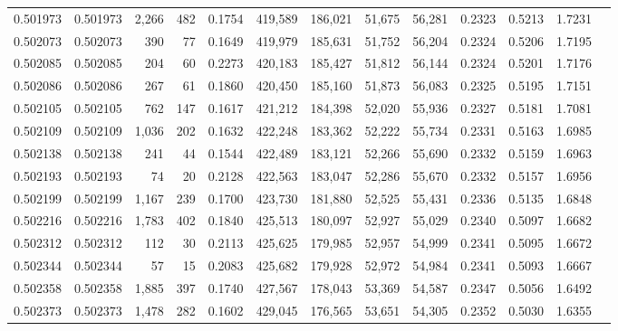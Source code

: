 \begin{tabular}{rrrrrrrrrrrrr}
0.501973 & 0.501973 & 2,266 &   482 &                                     0.1754 & 419,589 & 186,021 &  51,675 &  56,281 & 0.2323 & 0.5213 & 1.7231 \\
0.502073 & 0.502073 &   390 &    77 &                                     0.1649 & 419,979 & 185,631 &  51,752 &  56,204 & 0.2324 & 0.5206 & 1.7195 \\
0.502085 & 0.502085 &   204 &    60 &                                     0.2273 & 420,183 & 185,427 &  51,812 &  56,144 & 0.2324 & 0.5201 & 1.7176 \\
0.502086 & 0.502086 &   267 &    61 &                                     0.1860 & 420,450 & 185,160 &  51,873 &  56,083 & 0.2325 & 0.5195 & 1.7151 \\
0.502105 & 0.502105 &   762 &   147 &                                     0.1617 & 421,212 & 184,398 &  52,020 &  55,936 & 0.2327 & 0.5181 & 1.7081 \\
0.502109 & 0.502109 & 1,036 &   202 &                                     0.1632 & 422,248 & 183,362 &  52,222 &  55,734 & 0.2331 & 0.5163 & 1.6985 \\
0.502138 & 0.502138 &   241 &    44 &                                     0.1544 & 422,489 & 183,121 &  52,266 &  55,690 & 0.2332 & 0.5159 & 1.6963 \\
0.502193 & 0.502193 &    74 &    20 &                                     0.2128 & 422,563 & 183,047 &  52,286 &  55,670 & 0.2332 & 0.5157 & 1.6956 \\
0.502199 & 0.502199 & 1,167 &   239 &                                     0.1700 & 423,730 & 181,880 &  52,525 &  55,431 & 0.2336 & 0.5135 & 1.6848 \\
0.502216 & 0.502216 & 1,783 &   402 &                                     0.1840 & 425,513 & 180,097 &  52,927 &  55,029 & 0.2340 & 0.5097 & 1.6682 \\
0.502312 & 0.502312 &   112 &    30 &                                     0.2113 & 425,625 & 179,985 &  52,957 &  54,999 & 0.2341 & 0.5095 & 1.6672 \\
0.502344 & 0.502344 &    57 &    15 &                                     0.2083 & 425,682 & 179,928 &  52,972 &  54,984 & 0.2341 & 0.5093 & 1.6667 \\
0.502358 & 0.502358 & 1,885 &   397 &                                     0.1740 & 427,567 & 178,043 &  53,369 &  54,587 & 0.2347 & 0.5056 & 1.6492 \\
0.502373 & 0.502373 & 1,478 &   282 &                                     0.1602 & 429,045 & 176,565 &  53,651 &  54,305 & 0.2352 & 0.5030 & 1.6355 \\

\end{tabular}
